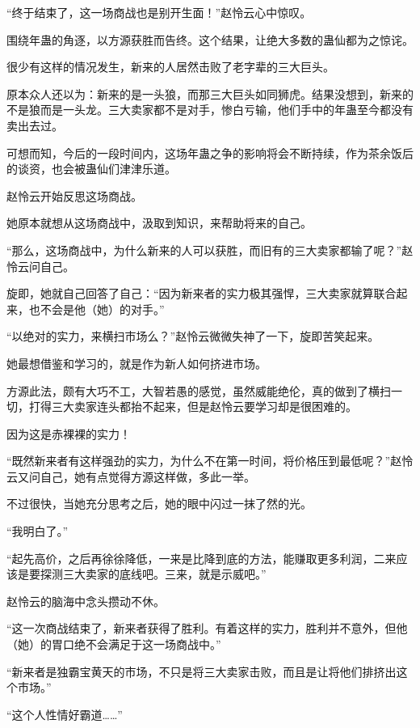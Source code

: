 
\begin{this_body}

“终于结束了，这一场商战也是别开生面！”赵怜云心中惊叹。

围绕年蛊的角逐，以方源获胜而告终。这个结果，让绝大多数的蛊仙都为之惊诧。

很少有这样的情况发生，新来的人居然击败了老字辈的三大巨头。

原本众人还以为：新来的是一头狼，而那三大巨头如同狮虎。结果没想到，新来的不是狼而是一头龙。三大卖家都不是对手，惨白亏输，他们手中的年蛊至今都没有卖出去过。

可想而知，今后的一段时间内，这场年蛊之争的影响将会不断持续，作为茶余饭后的谈资，也会被蛊仙们津津乐道。

赵怜云开始反思这场商战。

她原本就想从这场商战中，汲取到知识，来帮助将来的自己。

“那么，这场商战中，为什么新来的人可以获胜，而旧有的三大卖家都输了呢？”赵怜云问自己。

旋即，她就自己回答了自己：“因为新来者的实力极其强悍，三大卖家就算联合起来，也不会是他（她）的对手。”

“以绝对的实力，来横扫市场么？”赵怜云微微失神了一下，旋即苦笑起来。

她最想借鉴和学习的，就是作为新人如何挤进市场。

方源此法，颇有大巧不工，大智若愚的感觉，虽然威能绝伦，真的做到了横扫一切，打得三大卖家连头都抬不起来，但是赵怜云要学习却是很困难的。

因为这是赤裸裸的实力！

“既然新来者有这样强劲的实力，为什么不在第一时间，将价格压到最低呢？”赵怜云又问自己，她有点觉得方源这样做，多此一举。

不过很快，当她充分思考之后，她的眼中闪过一抹了然的光。

“我明白了。”

“起先高价，之后再徐徐降低，一来是比降到底的方法，能赚取更多利润，二来应该是要探测三大卖家的底线吧。三来，就是示威吧。”

赵怜云的脑海中念头攒动不休。

“这一次商战结束了，新来者获得了胜利。有着这样的实力，胜利并不意外，但他（她）的胃口绝不会满足于这一场商战中。”

“新来者是独霸宝黄天的市场，不只是将三大卖家击败，而且是让将他们排挤出这个市场。”

“这个人性情好霸道……”


\end{this_body}
